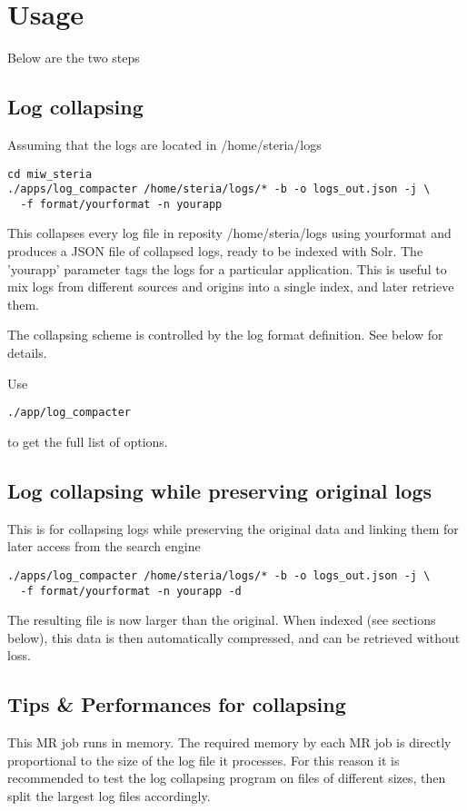 \documentclass[twoside,11pt]{article}
\begin{document}
\section{Usage}

Below are the two steps 

\subsection{Log collapsing}
Assuming that the logs are located in /home/steria/logs 
\begin{verbatim}
cd miw_steria
./apps/log_compacter /home/steria/logs/* -b -o logs_out.json -j \
  -f format/yourformat -n yourapp
\end{verbatim}
This collapses every log file in reposity /home/steria/logs using yourformat and produces a JSON file of collapsed logs, ready to be indexed with Solr. The 'yourapp' parameter tags the logs for a particular application. This is useful to mix logs from different sources and origins into a single index, and later retrieve them.

The collapsing scheme is controlled by the log format definition. See below for details.

Use
\begin{verbatim}
./app/log_compacter
\end{verbatim}
to get the full list of options.

\subsection{Log collapsing while preserving original logs}
This is for collapsing logs while preserving the original data and linking them for later access from the search engine
\begin{verbatim}
./apps/log_compacter /home/steria/logs/* -b -o logs_out.json -j \                                                                                            
  -f format/yourformat -n yourapp -d
\end{verbatim}

The resulting file is now larger than the original. When indexed (see sections below), this data is then automatically compressed, and can be retrieved without loss.

\subsection{Tips \& Performances for collapsing}
This MR job runs in memory. The required memory by each MR job is directly proportional to the size of the log file it processes. For this reason it is recommended to test the log collapsing program on files of different sizes, then split the largest log files accordingly.
\end{document}

